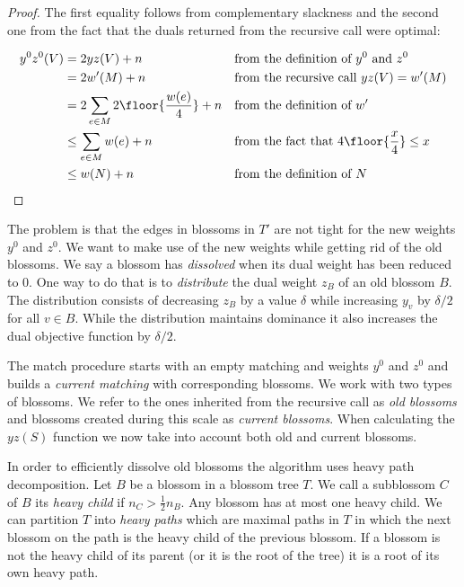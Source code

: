 \begin{proof}
    The first equality follows from complementary slackness and the second one from the fact that the duals returned from the recursive call were optimal:

    \begin{align*}
        y^0z^0(V) &= 2yz(V) + n && \text{from the definition of $y^0$ and $z^0$}\\
        &= 2w'(M) + n && \text{from the recursive call $yz(V) = w'(M)$} \\
        &= 2 \sum_{e \in M} 2 \floor{\frac{w(e)}{4}} + n && \text{from the definition of $w'$} \\
        &\leq \sum_{e \in M} w(e) + n && \text{from the fact that $4\floor{\frac{x}{4}} \leq x$} \\
        &\leq w(N) + n  && \text{from the definition of $N$} \\
    \end{align*}    
\end{proof}

The problem is that the edges in blossoms in $T'$ are not tight for the new weights $y^0$ and $z^0$. We want to make use of the new weights while getting rid of the old blossoms. We say a blossom has \textit{dissolved} when its dual weight has been reduced to $0$. One way to do that is to \textit{distribute} the dual weight $z_B$ of an old blossom $B$. The distribution consists of decreasing $z_B$ by a value $\delta$ while increasing $y_v$ by $\delta / 2$ for all $v \in B$. While the distribution maintains dominance it also increases the dual objective function by $\delta / 2$. 

The match procedure starts with an empty matching and weights $y^0$ and $z^0$ and builds a \textit{current matching} with corresponding blossoms. We work with two types of blossoms. We refer to the ones inherited from the recursive call as \textit{old blossoms} and blossoms created during this scale as \textit{current blossoms}. When calculating the $yz(S)$ function we now take into account both old and current blossoms.

In order to efficiently dissolve old blossoms the algorithm uses heavy path decomposition. Let $B$ be a blossom in a blossom tree $T$. We call a subblossom $C$ of $B$ its \textit{heavy child} if $n_C > \frac{1}{2}n_B$. Any blossom has at most one heavy child. We can partition $T$ into \textit{heavy paths} which are maximal paths in $T$ in which the next blossom on the path is the heavy child of the previous blossom. If a blossom is not the heavy child of its parent (or it is the root of the tree) it is a root of its own heavy path.

